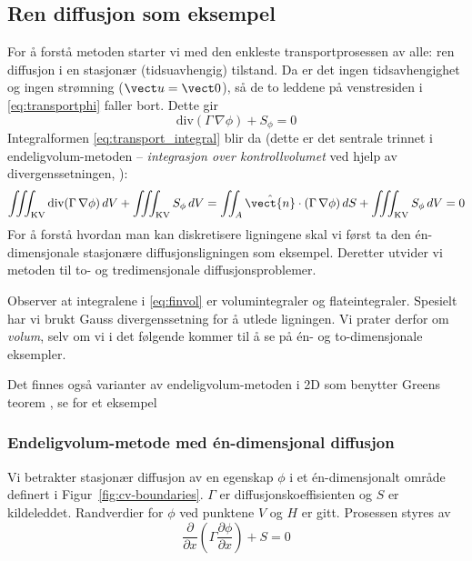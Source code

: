 \subsection{Ren diffusjon som eksempel}
For å forstå metoden starter vi med den enkleste transportprosessen av alle: ren diffusjon i en stasjonær (tidsuavhengig) tilstand. Da er det ingen tidsavhengighet og ingen strømning ($\vect u=\vect 0$), så de to leddene på venstresiden i \eqref{eq:transportphi} faller bort. Dette gir
\begin{equation}\label{eq:endelig_volum_eq}
\text{div}(\Gamma \, \nabla \phi) + S_{\phi} = 0
\end{equation}
Integralformen \eqref{eq:transport_integral} blir da (dette er det sentrale trinnet i endeligvolum-metoden -- \emph{integrasjon over kontrollvolumet} ved hjelp av divergenssetningen, ):
\begin{equation}\label{eq:finvol}
\iiint_{\text{KV}} \text{div}(\Gamma \, \nabla \phi) \, dV + \iiint_{\text{KV}} S_{\phi} \, dV
= \iint_{A} \hat{\vect{n}}\cdot (\Gamma \, \nabla \phi) \, dS + \iiint_{\text{KV}} S_{\phi} \, dV = 0
\end{equation}
For å forstå hvordan man kan diskretisere ligningene skal vi først ta den én-dimensjonale stasjonære diffusjonsligningen som eksempel. Deretter utvider vi metoden til to- og tredimensjonale diffusjonsproblemer. 

\begin{rem}{}
Observer at integralene i \eqref{eq:finvol} er volumintegraler og flateintegraler. Spesielt har vi brukt Gauss divergenssetning  for å utlede ligningen. Vi prater derfor om \textit{volum}, selv om vi i det følgende kommer til å se på én- og to-dimensjonale eksempler.

Det finnes også varianter av endeligvolum-metoden i 2D som benytter Greens teorem , se \cite[Chapter 14.3]{LaT03} for et eksempel
\end{rem}

\subsubsection*{Endeligvolum-metode med én-dimensjonal diffusjon}

Vi betrakter stasjonær diffusjon av en egenskap $\phi$ i et én-dimensjonalt område definert i Figur~\ref{fig:cv-boundaries}. $\Gamma$ er diffusjonskoeffisienten og $S$ er kildeleddet. Randverdier for $\phi$ ved punktene $V$ og $H$ er gitt. Prosessen styres av
\begin{equation}
\frac{\partial}{\partial x} \left( \Gamma \frac{\partial\phi}{\partial x} \right) + S = 0
\end{equation}


